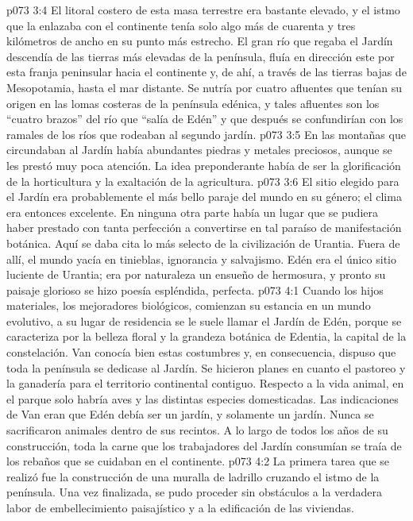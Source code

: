 \vs p073 3:4 El litoral costero de esta masa terrestre era bastante elevado, y el istmo que la enlazaba con el continente tenía solo algo más de cuarenta y tres kilómetros de ancho en su punto más estrecho. El gran río que regaba el Jardín descendía de las tierras más elevadas de la península, fluía en dirección este por esta franja peninsular hacia el continente y, de ahí, a través de las tierras bajas de Mesopotamia, hasta el mar distante. Se nutría por cuatro afluentes que tenían su origen en las lomas costeras de la península edénica, y tales afluentes son los “cuatro brazos” del río que “salía de Edén” y que después se confundirían con los ramales de los ríos que rodeaban al segundo jardín.
\vs p073 3:5 En las montañas que circundaban al Jardín había abundantes piedras y metales preciosos, aunque se les prestó muy poca atención. La idea preponderante había de ser la glorificación de la horticultura y la exaltación de la agricultura.
\vs p073 3:6 El sitio elegido para el Jardín era probablemente el más bello paraje del mundo en su género; el clima era entonces excelente. En ninguna otra parte había un lugar que se pudiera haber prestado con tanta perfección a convertirse en tal paraíso de manifestación botánica. Aquí se daba cita lo más selecto de la civilización de Urantia. Fuera de allí, el mundo yacía en tinieblas, ignorancia y salvajismo. Edén era el único sitio luciente de Urantia; era por naturaleza un ensueño de hermosura, y pronto su paisaje glorioso se hizo poesía espléndida, perfecta.
\vs p073 4:1 Cuando los hijos materiales, los mejoradores biológicos, comienzan su estancia en un mundo evolutivo, a su lugar de residencia se le suele llamar el Jardín de Edén, porque se caracteriza por la belleza floral y la grandeza botánica de Edentia, la capital de la constelación. Van conocía bien estas costumbres y, en consecuencia, dispuso que toda la península se dedicase al Jardín. Se hicieron planes en cuanto el pastoreo y la ganadería para el territorio continental contiguo. Respecto a la vida animal, en el parque solo habría aves y las distintas especies domesticadas. Las indicaciones de Van eran que Edén debía ser un jardín, y solamente un jardín. Nunca se sacrificaron animales dentro de sus recintos. A lo largo de todos los años de su construcción, toda la carne que los trabajadores del Jardín consumían se traía de los rebaños que se cuidaban en el continente.
\vs p073 4:2 La primera tarea que se realizó fue la construcción de una muralla de ladrillo cruzando el istmo de la península. Una vez finalizada, se pudo proceder sin obstáculos a la verdadera labor de embellecimiento paisajístico y a la edificación de las viviendas.

